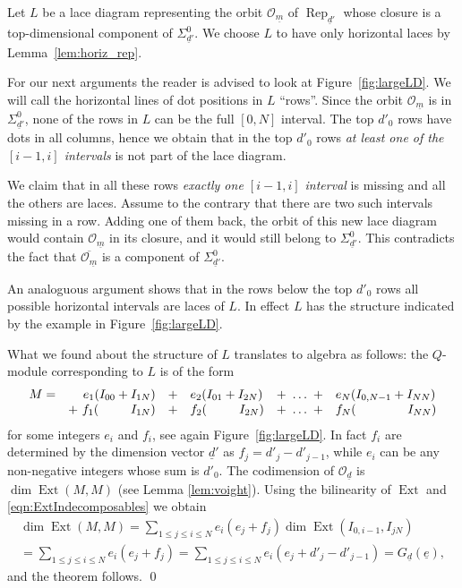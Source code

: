 \documentclass[a4paper]{amsart}
\DeclareMathOperator{\Ext}{Ext}
\DeclareMathOperator{\Rep}{\mathrm{Rep}}
\newcommand{\CO}{\mathcal{O}}
\newcommand{\um}{\underline{m}}
\newcommand{\ud}{\underline{d}}
\newcommand{\ue}{\underline{e}}
\theoremstyle{plain}
\begin{document}


Let $L$ be a lace diagram representing the orbit $\CO_{\um}$ of $\Rep_{\ud'}$ whose closure is a top-dimensional component of $\Sigma^0_{\ud'}$. We choose $L$ to have only horizontal laces by Lemma~\ref{lem:horiz_rep}.

For our next arguments the reader is advised to look at Figure~\ref{fig:largeLD}. We will call the horizontal lines of dot positions in $L$ ``rows''. Since the orbit $\CO_{\um}$ is in $\Sigma^0_{\ud'}$, none of the rows in $L$ can be the full $[0,N]$ interval. The top $d'_0$ rows have dots in all columns, hence we obtain that in the top $d'_0$ rows {\em at least one of the $[i-1,i]$ intervals} is not part of the lace diagram. 

We claim that in all these rows {\em exactly one $[i-1,i]$ interval} is missing and all the others are laces. Assume to the contrary that there are two such intervals missing in a row. Adding one of them back, the orbit of this new lace diagram would contain $\CO_{\um}$ in its closure, and it would still belong to $\Sigma^0_{\ud'}$. This contradicts the fact that $\overline{\CO_{\um}}$ is a  component of $\Sigma^0_{\ud'}$.

An analoguous argument shows that in the rows below the top $d'_0$ rows all possible horizontal intervals are laces of $L$. In effect $L$ has the structure indicated by the example in Figure~\ref{fig:largeLD}.

What we found about the structure of $L$ translates to algebra as follows: the $Q$-module corresponding to $L$ is of the form
\[
\begin{array}{lrclcl}
M= &      e_1(I_{00}+I_{1N})  & +& e_2(I_{01}+I_{2N}) & + ~ \ldots ~ + & e_N(I_{0,N-1}+I_{NN})  \\
&
   + ~ f_1({\hskip 0.9 true cm} I_{1N}) 
      & +& f_2({\hskip .91 true cm} I_{2N}) 
        & + ~ \ldots ~ + 
           & f_N({\hskip 1.45 true cm}I_{NN})
\end{array}
\]
for some integers $e_i$ and $f_i$, see again Figure~\ref{fig:largeLD}. In fact $f_i$ are determined by the dimension vector $\ud'$ as $f_j=d'_j-d'_{j-1}$, while $e_i$ can be any non-negative integers whose sum is $d'_0$. 
The codimension of $\CO_{\ud}$ is $\dim\Ext(M,M)$ (see Lemma \ref{lem:voight}). Using the bilinearity of $\Ext$ and \eqref{eqn:ExtIndecomposables} we obtain
\begin{multline*}
\dim \Ext(M,M)= \sum_{1\leq j\leq i\leq N} e_i(e_j+f_j) \dim \Ext(I_{0,{i-1}},I_{jN}) 
\\=
\sum_{1\leq j\leq i\leq N} e_i(e_j+f_j)
=\sum_{1\leq j\leq i\leq N} e_i(e_j+d'_j-d'_{j-1})=G_{\ud}(\ue),
\end{multline*}
and the theorem follows. \qed
\end{document}
